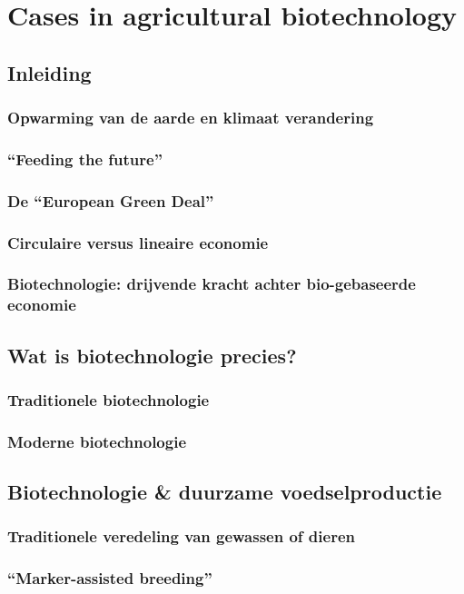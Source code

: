 \documentclass[a4paper,kul]{kulakarticle} %
\begin{document}
\section{Cases in agricultural biotechnology}
\subsection{Inleiding}
\subsubsection{Opwarming van de aarde en klimaat verandering}
\subsubsection{“Feeding the future”}
\subsubsection{De “European Green Deal”}
\subsubsection{Circulaire versus lineaire economie}
\subsubsection{Biotechnologie: drijvende kracht achter bio-gebaseerde economie}
\subsection{Wat is biotechnologie precies?}
\subsubsection{Traditionele biotechnologie}
\subsubsection{Moderne biotechnologie}
\subsection{Biotechnologie \& duurzame voedselproductie}
\subsubsection{Traditionele veredeling van gewassen of dieren}
\subsubsection{“Marker-assisted breeding”}
\end{document}
